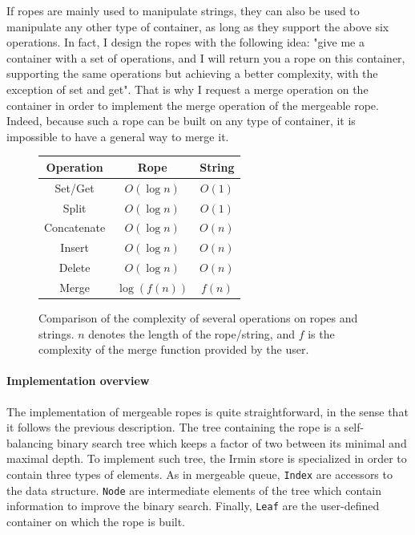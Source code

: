 \documentclass{article}
\newcommand{\irmin}{Irmin\xspace}
\newcommand{\code}[1]{\texttt{#1}}
\begin{document}
If ropes are mainly used to manipulate strings, they can also be used to manipulate any other type of container, as long as they support the above six operations.
In fact, I design the ropes with the following idea:
"give me a container with a set of operations, and I will return you a rope on this container, supporting the same operations but achieving a better complexity, with the exception of set and get".
That is why I request a merge operation on the container in order to implement the merge operation of the mergeable rope.
Indeed, because such a rope can be built on any type of container, it is impossible to have a general way to merge it.

\begin{figure}[hbt]
\centering
\setlength{\tabcolsep}{1cm}
\begin{tabular}{|c|c|c|}
\hline
	Operation &
	Rope &
	String \\
\hline
	Set/Get &
	\cellcolor{butter!20} $O(\log n)$ &
	\cellcolor{chameleon!20} $O(1)$ \\
\hline
	Split &
	\cellcolor{butter!20} $O(\log n)$ &
	\cellcolor{chameleon!20} $O(1)$ \\
\hline
	Concatenate &
	\cellcolor{butter!20} $O(\log n)$ &
	\cellcolor{scarletred!20} $O(n)$ \\
\hline
	Insert &
	\cellcolor{butter!20} $O(\log n)$ &
	\cellcolor{scarletred!20} $O(n)$ \\
\hline
	Delete &
	\cellcolor{butter!20} $O(\log n)$ &
	\cellcolor{scarletred!20} $O(n)$ \\
\hline
\hline
	Merge &
	\cellcolor{chameleon!20} $\log\left(f(n)\right)$ &
	\cellcolor{butter!20} $f(n)$ \\
\hline
\end{tabular}
\caption{Comparison of the complexity of several operations on ropes and strings. $n$ denotes the length of the rope/string, and $f$ is the complexity of the merge function provided by the user.}
\label{ropetable}
\end{figure}


\paragraph{Implementation overview}
The implementation of mergeable ropes is quite straightforward, in the sense that it follows the previous description.
The tree containing the rope is a self-balancing binary search tree which keeps a factor of two between its minimal and maximal depth.
To implement such tree, the \irmin store is specialized in order to contain three types of elements.
As in mergeable queue, \code{Index} are accessors to the data structure.
\code{Node} are intermediate elements of the tree which contain information to improve the binary search.
Finally, \code{Leaf} are the user-defined container on which the rope is built.
\end{document}
